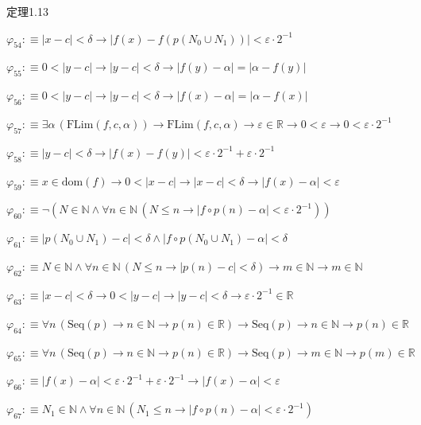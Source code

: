 \begin{fullproof}{定理1.13}
\begin{abbrevlist}
\item $\varphi_{54} :\equiv \lvert x - c \rvert < \delta \to \lvert f(x) - f(p(N_{0} \cup N_{1})) \rvert < \varepsilon \cdot 2^{-1}$
\item $\varphi_{55} :\equiv 0 < \lvert y - c \rvert \to \lvert y - c \rvert < \delta \to \lvert f(y) - \alpha \rvert = \lvert \alpha - f(y) \rvert$
\item $\varphi_{56} :\equiv 0 < \lvert y - c \rvert \to \lvert y - c \rvert < \delta \to \lvert f(x) - \alpha \rvert = \lvert \alpha - f(x) \rvert$
\item $\varphi_{57} :\equiv \exists \alpha\,(\mathrm{FLim}(f,c,\alpha)) \to \mathrm{FLim}(f,c,\alpha) \to \varepsilon \in \mathbb{R} \to 0 < \varepsilon \to 0 < \varepsilon \cdot 2^{-1}$
\item $\varphi_{58} :\equiv \lvert y - c \rvert < \delta \to \lvert f(x) - f(y) \rvert < \varepsilon \cdot 2^{-1} + \varepsilon \cdot 2^{-1}$
\item $\varphi_{59} :\equiv x \in \mathrm{dom}(f) \to 0 < \lvert x - c \rvert \to \lvert x - c \rvert < \delta \to \lvert f(x) - \alpha \rvert < \varepsilon$
\item $\varphi_{60} :\equiv \neg (N \in \mathbb{N} \land \forall n \in \mathbb{N}\,(N \leq n \to \lvert f \circ p(n) - \alpha \rvert < \varepsilon \cdot 2^{-1}))$
\item $\varphi_{61} :\equiv \lvert p(N_{0} \cup N_{1}) - c \rvert < \delta \land \lvert f \circ p(N_{0} \cup N_{1}) - \alpha \rvert < \delta$
\item $\varphi_{62} :\equiv N \in \mathbb{N} \land \forall n \in \mathbb{N}\,(N \leq n \to \lvert p(n) - c \rvert < \delta) \to m \in \mathbb{N} \to m \in \mathbb{N}$
\item $\varphi_{63} :\equiv \lvert x - c \rvert < \delta \to 0 < \lvert y - c \rvert \to \lvert y - c \rvert < \delta \to \varepsilon \cdot 2^{-1} \in \mathbb{R}$
\item $\varphi_{64} :\equiv \forall n\,(\mathrm{Seq}(p) \to n \in \mathbb{N} \to p(n) \in \mathbb{R}) \to \mathrm{Seq}(p) \to n \in \mathbb{N} \to p(n) \in \mathbb{R}$
\item $\varphi_{65} :\equiv \forall n\,(\mathrm{Seq}(p) \to n \in \mathbb{N} \to p(n) \in \mathbb{R}) \to \mathrm{Seq}(p) \to m \in \mathbb{N} \to p(m) \in \mathbb{R}$
\item $\varphi_{66} :\equiv \lvert f(x) - \alpha \rvert < \varepsilon \cdot 2^{-1} + \varepsilon \cdot 2^{-1} \to \lvert f(x) - \alpha \rvert < \varepsilon$
\item $\varphi_{67} :\equiv N_{1} \in \mathbb{N} \land \forall n \in \mathbb{N}\,(N_{1} \leq n \to \lvert f \circ p(n) - \alpha \rvert < \varepsilon \cdot 2^{-1})$

\end{abbrevlist}
\end{fullproof}
